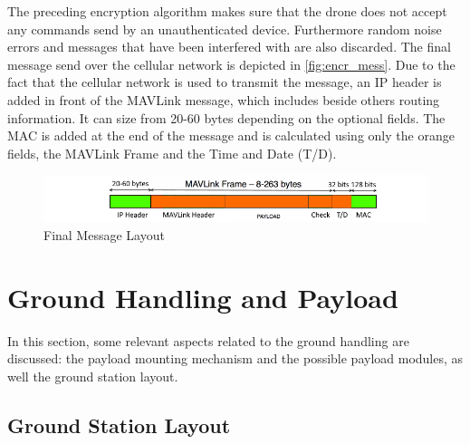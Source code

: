 The preceding encryption algorithm makes sure that the drone does not accept any commands send by an unauthenticated device. Furthermore random noise errors and messages that have been interfered with are also discarded. The final message send over the cellular network is depicted in \autoref{fig:encr_mess}. Due to the fact that the cellular network is used to transmit the message, an IP header is added in front of the MAVLink message, which includes beside others routing information. It can size from 20-60 bytes depending on the optional fields. The MAC is added at the end of the message and is calculated using only the orange fields, the MAVLink Frame and the Time and Date (T/D).

\begin{figure}[htb]
    \centering
    \includegraphics[width=\textwidth]{./CommandDataHandling/Figures/encryption}
    \caption{Final Message Layout}
    \label{fig:encr_mess}
\end{figure}






\section{Ground Handling and Payload}%
\label{sec:grou_hand_payl}

In this section, some relevant aspects related to the ground handling are discussed: the payload mounting mechanism and the possible payload modules, as well the ground station layout.


\subsection{Ground Station Layout}%
\label{sec:grou_stat_layo}



